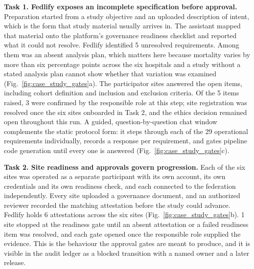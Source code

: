 \documentclass[preprint,5p, 10pt, times]{elsarticle}
\begin{document}
\textbf{Task 1. Fedlify exposes an incomplete specification before approval.}
Preparation started from a study objective and an uploaded description of intent, which is the form that study material usually arrives in. The assistant mapped that material onto the platform's governance readiness checklist and reported what it could not resolve. Fedlify identified 5 unresolved requirements. Among them was an absent analysis plan, which matters here because mortality varies by more than six percentage points across the six hospitals and a study without a stated analysis plan cannot show whether that variation was examined (Fig.~\ref{fig:case_study_gates}a).
The participator sites answered the open items, including cohort definition and inclusion and exclusion criteria. Of the 5 items raised, 3 were confirmed by the responsible role at this step; site registration was resolved once the six sites onboarded in Task 2, and the ethics decision remained open throughout this run. A guided, question-by-question chat window complements the static protocol form: it steps through each of the 29 operational requirements individually, records a response per requirement, and gates pipeline code generation until every one is answered (Fig.~\ref{fig:case_study_gates}c).

\textbf{Task 2. Site readiness and approvals govern progression.}
Each of the six sites was operated as a separate participant with its own account, its own credentials and its own readiness check, and each connected to the federation independently. Every site uploaded a governance document, and an authorized reviewer recorded the matching attestation before the study could advance. Fedlify holds 6 attestations across the six sites (Fig.~\ref{fig:case_study_gates}b). 1 site stopped at the readiness gate until an absent attestation or a failed readiness item was resolved, and each gate opened once the responsible role supplied the evidence. This is the behaviour the approval gates are meant to produce, and it is visible in the audit ledger as a blocked transition with a named owner and a later release.
\end{document}
